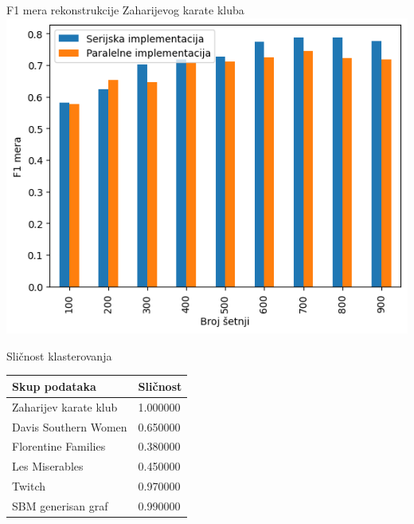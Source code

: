 \documentclass{beamer}
\begin{document}
\begin{frame}{F1 mera rekonstrukcije Zaharijevog karate kluba}
    \centering 
    \includegraphics[height=0.8\textheight]{./csv/4.4.png}
\end{frame}

\begin{frame}{Sličnost klasterovanja}
    \centering
    \begin{table}
        \label{tab:4.11}
        \begin{tabular}{p{1.5in}p{1in}}
        \hline
        Skup podataka & Sličnost \\
        \hline
        Zaharijev karate klub & 1.000000 \\
        Davis Southern Women & 0.650000 \\
        Florentine Families & 0.380000 \\
        Les Miserables & 0.450000 \\
        Twitch & 0.970000 \\
        SBM generisan graf & 0.990000 \\
        \hline
    \end{tabular}
    \end{table}
\end{frame}
\end{document}
